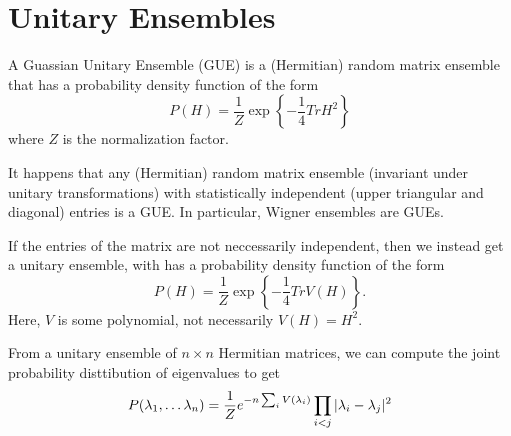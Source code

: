\section{Unitary Ensembles}
A Guassian Unitary Ensemble (GUE) is a (Hermitian) random matrix ensemble that has a probability density function of the form
\[
    P(H) = \frac{1}{Z}\exp\left\{ -\frac{1}{4}Tr H^2 \right\}
\]
where $Z$ is the normalization factor.

It happens that any (Hermitian) random matrix ensemble (invariant under unitary transformations) with statistically independent (upper triangular and diagonal) entries is a GUE. In particular, Wigner ensembles are GUEs.

If the entries of the matrix are not neccessarily independent, then we instead get a unitary ensemble, with has a probability density function of the form
\[
    P(H) = \frac{1}{Z}\exp\left\{ -\frac{1}{4}Tr V(H) \right\}.
\]
Here, $V$ is some polynomial, not necessarily $V(H) = H^2$.

From a unitary ensemble of $n \times n$ Hermitian matrices, we can compute the joint probability disttibution of eigenvalues to get
\[
    P(\lambda_1, \dots \lambda_n) = \frac{1}{Z}e^{-n \sum_i V(\lambda_i)} \prod_{i < j} |\lambda_i-\lambda_j|^2
\]
